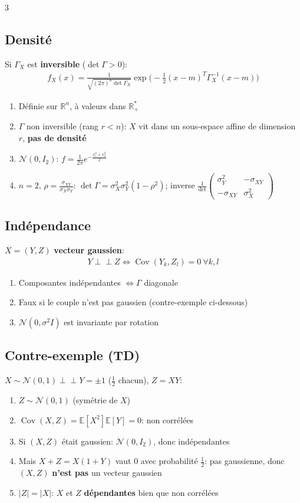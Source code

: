 \documentclass[12pt, a4paper]{article}
\newcommand{\E}{\mathbb{E}}
\newcommand{\R}{\mathbb{R}}
\newcommand{\Cov}{\operatorname{Cov}}
\begin{document}
\begin{multicols*}{3}
	\colbreak
	\subsection{Densité}
	Si $\Gamma_X$ est \textbf{inversible} ($\det\Gamma>0$):
	\begin{gather*}
		f_X(x)=\frac1{\sqrt{(2\pi)^n\det\Gamma_X}}\exp\Big(-\frac12(x-m)^T\Gamma_X^{-1}(x-m)\Big)
	\end{gather*}
	\begin{enumerate}[\roman*.]
		\item Définie sur $\R^n$, à valeurs dans $\R_+^*$
		\item $\Gamma$ non inversible (rang $r<n$): $X$ vit dans un sous-espace affine de dimension $r$, \textbf{pas de densité}
		\item $\mathcal N(0,I_2)$: $f=\frac1{2\pi}e^{-\frac{x_1^2+x_2^2}2}$
		\item $n=2$, $\rho=\frac{\sigma_{XY}}{\sigma_X\sigma_Y}$: $\det\Gamma=\sigma_X^2\sigma_Y^2(1-\rho^2)$; inverse $\frac1{\det}\begin{pmatrix}\sigma_Y^2&-\sigma_{XY}\\-\sigma_{XY}&\sigma_X^2\end{pmatrix}$
	\end{enumerate}

	\subsection{Indépendance}
	$X=(Y,Z)$ \textbf{vecteur gaussien}:
	\begin{gather*}
		Y\perp\!\!\!\perp Z\iff\Cov(Y_k,Z_l)=0\ \forall k,l
	\end{gather*}
	\begin{enumerate}[\roman*.]
		\item Composantes indépendantes $\iff\Gamma$ diagonale
		\item Faux si le couple n'est pas gaussien (contre-exemple ci-dessous)
		\item $\mathcal N(0,\sigma^2I)$ est invariante par rotation
	\end{enumerate}

	\subsection{Contre-exemple (TD)}
	$X\sim\mathcal N(0,1)\perp\!\!\!\perp Y=\pm1$ ($\frac12$ chacun), $Z=XY$:
	\begin{enumerate}[\roman*.]
		\item $Z\sim\mathcal N(0,1)$ (symétrie de $X$)
		\item $\Cov(X,Z)=\E[X^2]\E[Y]=0$: non corrélées
		\item Si $(X,Z)$ était gaussien: $\mathcal N(0,I_2)$, donc indépendantes
		\item Mais $X+Z=X(1+Y)$ vaut 0 avec probabilité $\frac12$: pas gaussienne, donc $(X,Z)$ \textbf{n'est pas} un vecteur gaussien
		\item $|Z|=|X|$: $X$ et $Z$ \textbf{dépendantes} bien que non corrélées
	\end{enumerate}


\end{multicols*}
\end{document}
